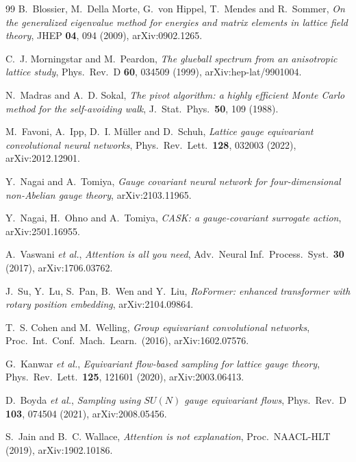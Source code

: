 \documentclass[aps,prl,reprint,superscriptaddress,nofootinbib]{revtex4-2}
\begin{document}
\begin{thebibliography}{99}
B.~Blossier, M.~Della Morte, G.~von Hippel, T.~Mendes and R.~Sommer,
\emph{On the generalized eigenvalue method for energies and matrix elements in
lattice field theory}, JHEP \textbf{04}, 094 (2009), arXiv:0902.1265.

C.~J. Morningstar and M.~Peardon, \emph{The glueball spectrum from an
anisotropic lattice study}, Phys.\ Rev.\ D \textbf{60}, 034509 (1999),
arXiv:hep-lat/9901004.

N.~Madras and A.~D. Sokal, \emph{The pivot algorithm: a highly efficient Monte
Carlo method for the self-avoiding walk},
J.\ Stat.\ Phys.\ \textbf{50}, 109 (1988).

M.~Favoni, A.~Ipp, D.~I. M\"uller and D.~Schuh, \emph{Lattice gauge equivariant
convolutional neural networks}, Phys.\ Rev.\ Lett.\ \textbf{128}, 032003 (2022),
arXiv:2012.12901.

Y.~Nagai and A.~Tomiya, \emph{Gauge covariant neural network for
four-dimensional non-Abelian gauge theory}, arXiv:2103.11965.

Y.~Nagai, H.~Ohno and A.~Tomiya, \emph{CASK: a gauge-covariant surrogate
action}, arXiv:2501.16955.

A.~Vaswani \emph{et al.}, \emph{Attention is all you need},
Adv.\ Neural Inf.\ Process.\ Syst.\ \textbf{30} (2017), arXiv:1706.03762.

J.~Su, Y.~Lu, S.~Pan, B.~Wen and Y.~Liu, \emph{RoFormer: enhanced transformer
with rotary position embedding}, arXiv:2104.09864.

T.~S. Cohen and M.~Welling, \emph{Group equivariant convolutional networks},
Proc.\ Int.\ Conf.\ Mach.\ Learn.\ (2016), arXiv:1602.07576.

G.~Kanwar \emph{et al.}, \emph{Equivariant flow-based sampling for lattice gauge
theory}, Phys.\ Rev.\ Lett.\ \textbf{125}, 121601 (2020), arXiv:2003.06413.

D.~Boyda \emph{et al.}, \emph{Sampling using $SU(N)$ gauge equivariant flows},
Phys.\ Rev.\ D \textbf{103}, 074504 (2021), arXiv:2008.05456.

S.~Jain and B.~C. Wallace, \emph{Attention is not explanation},
Proc.\ NAACL-HLT (2019), arXiv:1902.10186.

\end{thebibliography}
\end{document}
